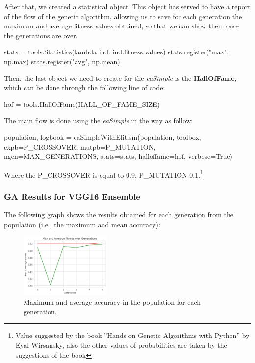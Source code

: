 After that, we created a statistical object. This object has served to have a report of the flow of the genetic algorithm, allowing us to save for each generation the maximum and average fitness values obtained, so that we can show them once the generations are over.

\begin{python}
stats = tools.Statistics(lambda ind: ind.fitness.values)
stats.register("max", np.max)
stats.register("avg", np.mean)
\end{python}

Then, the last object we need to create for the \textit{eaSimple} is the \textbf{HallOfFame}, which can be done through the following line of code:

\begin{python}
hof = tools.HallOfFame(HALL_OF_FAME_SIZE)
\end{python}

The main flow is done using the \textit{eaSimple} in the way as follow:

\begin{python}
population, logbook = eaSimpleWithElitism(population,
								  toolbox,
								  cxpb=P_CROSSOVER,
								  mutpb=P_MUTATION,
								  ngen=MAX_GENERATIONS,
								  stats=stats,
								  halloffame=hof,
								  verbose=True)
\end{python}

Where the P\_CROSSOVER is equal to 0.9, P\_MUTATION 0.1.\footnote{Value suggested by the book ”Hands on Genetic Algorithms with Python” by Eyal Wirsansky, also the other values of probabilities are taken by the suggestions of the book}



\subsubsection{GA Results for VGG16 Ensemble}
The following graph shows the results obtained for each generation from the population (i.e., the maximum and mean accuracy):

\begin{figure}[H]
	\centering
	\includegraphics[width=0.4\textwidth]{img/ensemble/vgg.png}
	\caption{Maximum and average accuracy in the population for each generation.}
	\label{fig:ensemblevgg}
\end{figure}


